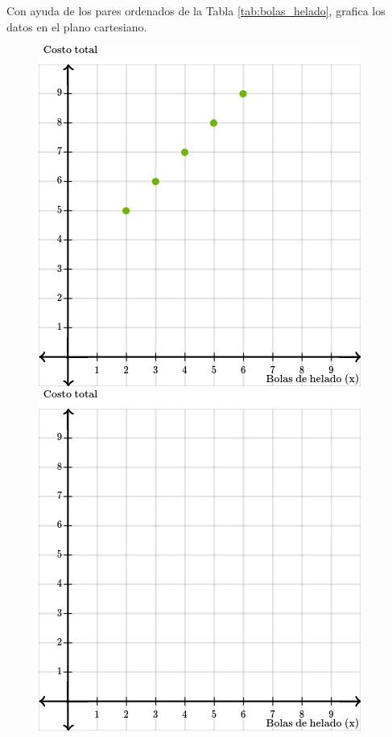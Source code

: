 \begin{multicols}{2}
\begin{parts}
        \columnbreak

        Con ayuda de los pares ordenados de la Tabla \ref{tab:bolas_helado}, grafica los datos en el plano cartesiano.

        \begin{figure}[H]
            \centering
            \ifprintanswers
                \includegraphics[width=0.6\linewidth]{../images/20230321002620}
            \else
                \includegraphics[width=0.6\linewidth]{../images/20230321002620_blank}
            \fi
        \end{figure}
    \end{parts}%
\end{multicols}%
